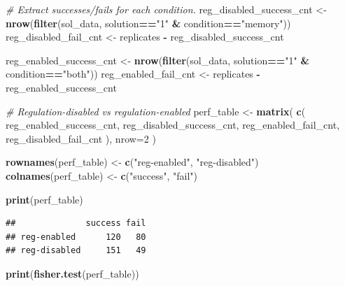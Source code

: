 \documentclass[
]{book}
\newenvironment{Shaded}{\begin{snugshade}}{\end{snugshade}}
\newcommand{\CommentTok}[1]{\textcolor[rgb]{0.56,0.35,0.01}{\textit{#1}}}
\newcommand{\DataTypeTok}[1]{\textcolor[rgb]{0.13,0.29,0.53}{#1}}
\newcommand{\DecValTok}[1]{\textcolor[rgb]{0.00,0.00,0.81}{#1}}
\newcommand{\KeywordTok}[1]{\textcolor[rgb]{0.13,0.29,0.53}{\textbf{#1}}}
\newcommand{\NormalTok}[1]{#1}
\newcommand{\OperatorTok}[1]{\textcolor[rgb]{0.81,0.36,0.00}{\textbf{#1}}}
\newcommand{\StringTok}[1]{\textcolor[rgb]{0.31,0.60,0.02}{#1}}
\begin{document}
\begin{Shaded}
\begin{Highlighting}[]
\CommentTok{\# Extract successes/fails for each condition.}
\NormalTok{reg\_disabled\_success\_cnt \textless{}{-}}\StringTok{ }\KeywordTok{nrow}\NormalTok{(}\KeywordTok{filter}\NormalTok{(sol\_data, solution}\OperatorTok{==}\StringTok{"1"} \OperatorTok{\&}\StringTok{ }\NormalTok{condition}\OperatorTok{==}\StringTok{"memory"}\NormalTok{))}
\NormalTok{reg\_disabled\_fail\_cnt \textless{}{-}}\StringTok{ }\NormalTok{replicates }\OperatorTok{{-}}\StringTok{ }\NormalTok{reg\_disabled\_success\_cnt}

\NormalTok{reg\_enabled\_success\_cnt \textless{}{-}}\StringTok{ }\KeywordTok{nrow}\NormalTok{(}\KeywordTok{filter}\NormalTok{(sol\_data, solution}\OperatorTok{==}\StringTok{"1"} \OperatorTok{\&}\StringTok{ }\NormalTok{condition}\OperatorTok{==}\StringTok{"both"}\NormalTok{))}
\NormalTok{reg\_enabled\_fail\_cnt \textless{}{-}}\StringTok{ }\NormalTok{replicates }\OperatorTok{{-}}\StringTok{ }\NormalTok{reg\_enabled\_success\_cnt}

\CommentTok{\# Regulation{-}disabled vs regulation{-}enabled}
\NormalTok{perf\_table \textless{}{-}}\StringTok{ }\KeywordTok{matrix}\NormalTok{(}
  \KeywordTok{c}\NormalTok{(}
\NormalTok{    reg\_enabled\_success\_cnt,}
\NormalTok{    reg\_disabled\_success\_cnt,}
\NormalTok{    reg\_enabled\_fail\_cnt,}
\NormalTok{    reg\_disabled\_fail\_cnt}
\NormalTok{    ),}
    \DataTypeTok{nrow=}\DecValTok{2}
\NormalTok{)}

\KeywordTok{rownames}\NormalTok{(perf\_table) \textless{}{-}}\StringTok{ }\KeywordTok{c}\NormalTok{(}\StringTok{"reg{-}enabled"}\NormalTok{, }\StringTok{"reg{-}disabled"}\NormalTok{)}
\KeywordTok{colnames}\NormalTok{(perf\_table) \textless{}{-}}\StringTok{ }\KeywordTok{c}\NormalTok{(}\StringTok{"success"}\NormalTok{, }\StringTok{"fail"}\NormalTok{)}

\KeywordTok{print}\NormalTok{(perf\_table)}
\end{Highlighting}
\end{Shaded}

\begin{verbatim}
##              success fail
## reg-enabled      120   80
## reg-disabled     151   49
\end{verbatim}

\begin{Shaded}
\begin{Highlighting}[]
\KeywordTok{print}\NormalTok{(}\KeywordTok{fisher.test}\NormalTok{(perf\_table))}
\end{Highlighting}
\end{Shaded}
\end{document}
